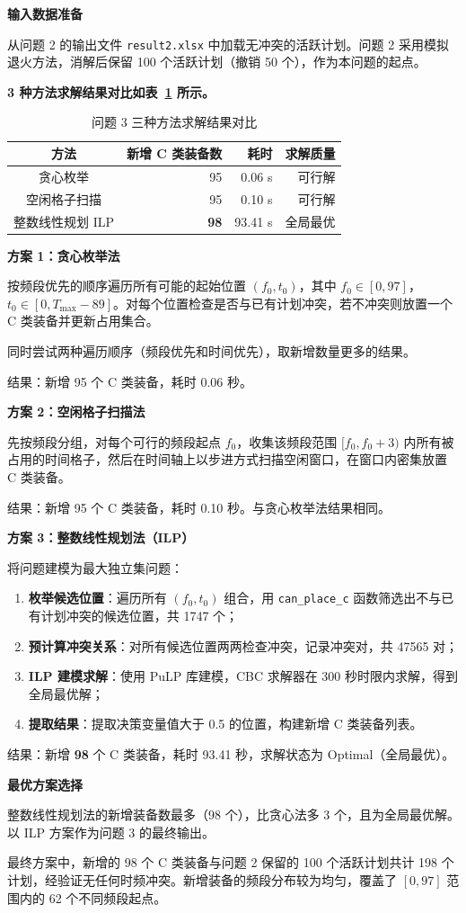 
\textbf{输入数据准备}

从问题 2 的输出文件 \texttt{result2.xlsx} 中加载无冲突的活跃计划。问题 2 采用模拟退火方法，消解后保留 100 个活跃计划（撤销 50 个），作为本问题的起点。

\textbf{3 种方法求解结果对比如表~\ref{tab:q3_compare} 所示。}

\begin{table}[htbp]
\centering
\caption{问题 3 三种方法求解结果对比}
\label{tab:q3_compare}
\begin{tabular}{crrr}
\toprule
方法 & 新增 C 类装备数 & 耗时 & 求解质量 \\
\midrule
贪心枚举 & 95 & 0.06 s & 可行解 \\
空闲格子扫描 & 95 & 0.10 s & 可行解 \\
整数线性规划 ILP & \textbf{98} & 93.41 s & 全局最优 \\
\bottomrule
\end{tabular}
\end{table}

\textbf{方案 1：贪心枚举法}

按频段优先的顺序遍历所有可能的起始位置 $(f_0, t_0)$，其中 $f_0 \in [0, 97]$，$t_0 \in [0, T_{\max} - 89]$。对每个位置检查是否与已有计划冲突，若不冲突则放置一个 C 类装备并更新占用集合。

同时尝试两种遍历顺序（频段优先和时间优先），取新增数量更多的结果。

结果：新增 95 个 C 类装备，耗时 0.06 秒。

\textbf{方案 2：空闲格子扫描法}

先按频段分组，对每个可行的频段起点 $f_0$，收集该频段范围 $[f_0, f_0+3)$ 内所有被占用的时间格子，然后在时间轴上以步进方式扫描空闲窗口，在窗口内密集放置 C 类装备。

结果：新增 95 个 C 类装备，耗时 0.10 秒。与贪心枚举法结果相同。

\textbf{方案 3：整数线性规划法（ILP）}

将问题建模为最大独立集问题：

\begin{enumerate}
    \item \textbf{枚举候选位置}：遍历所有 $(f_0, t_0)$ 组合，用 \texttt{can\_place\_c} 函数筛选出不与已有计划冲突的候选位置，共 1747 个；
    \item \textbf{预计算冲突关系}：对所有候选位置两两检查冲突，记录冲突对，共 47565 对；
    \item \textbf{ILP 建模求解}：使用 PuLP 库建模，CBC 求解器在 300 秒时限内求解，得到全局最优解；
    \item \textbf{提取结果}：提取决策变量值大于 0.5 的位置，构建新增 C 类装备列表。
\end{enumerate}

结果：新增 \textbf{98} 个 C 类装备，耗时 93.41 秒，求解状态为 Optimal（全局最优）。

\textbf{最优方案选择}

整数线性规划法的新增装备数最多（98 个），比贪心法多 3 个，且为全局最优解。以 ILP 方案作为问题 3 的最终输出。

最终方案中，新增的 98 个 C 类装备与问题 2 保留的 100 个活跃计划共计 198 个计划，经验证无任何时频冲突。新增装备的频段分布较为均匀，覆盖了 $[0, 97]$ 范围内的 62 个不同频段起点。
